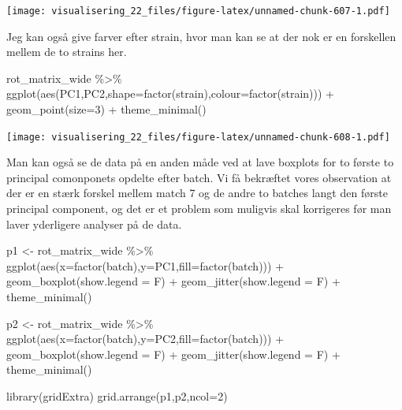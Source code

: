\documentclass[
]{book}
\newenvironment{Shaded}{\begin{snugshade}}{\end{snugshade}}
\newcommand{\AttributeTok}[1]{\textcolor[rgb]{0.77,0.63,0.00}{#1}}
\newcommand{\DecValTok}[1]{\textcolor[rgb]{0.00,0.00,0.81}{#1}}
\newcommand{\FunctionTok}[1]{\textcolor[rgb]{0.00,0.00,0.00}{#1}}
\newcommand{\NormalTok}[1]{#1}
\newcommand{\OtherTok}[1]{\textcolor[rgb]{0.56,0.35,0.01}{#1}}
\newcommand{\SpecialCharTok}[1]{\textcolor[rgb]{0.00,0.00,0.00}{#1}}
\begin{document}
\texttt{[image: visualisering\_22\_files/figure-latex/unnamed-chunk-607-1.pdf]}

Jeg kan også give farver efter strain, hvor man kan se at der nok er en forskellen mellem de to strains her.

\begin{Shaded}
\begin{Highlighting}[]
\NormalTok{rot\_matrix\_wide }\SpecialCharTok{\%\textgreater{}\%}
  \FunctionTok{ggplot}\NormalTok{(}\FunctionTok{aes}\NormalTok{(PC1,PC2,}\AttributeTok{shape=}\FunctionTok{factor}\NormalTok{(strain),}\AttributeTok{colour=}\FunctionTok{factor}\NormalTok{(strain))) }\SpecialCharTok{+} 
  \FunctionTok{geom\_point}\NormalTok{(}\AttributeTok{size=}\DecValTok{3}\NormalTok{) }\SpecialCharTok{+}
  \FunctionTok{theme\_minimal}\NormalTok{()}
\end{Highlighting}
\end{Shaded}

\texttt{[image: visualisering\_22\_files/figure-latex/unnamed-chunk-608-1.pdf]}

Man kan også se de data på en anden måde ved at lave boxplots for to første to principal comonponets opdelte efter batch. Vi få bekræftet vores observation at der er en stærk forskel mellem match 7 og de andre to batches langt den første principal component, og det er et problem som muligvis skal korrigeres før man laver yderligere analyser på de data.

\begin{Shaded}
\begin{Highlighting}[]
\NormalTok{p1 }\OtherTok{\textless{}{-}}\NormalTok{ rot\_matrix\_wide }\SpecialCharTok{\%\textgreater{}\%} 
  \FunctionTok{ggplot}\NormalTok{(}\FunctionTok{aes}\NormalTok{(}\AttributeTok{x=}\FunctionTok{factor}\NormalTok{(batch),}\AttributeTok{y=}\NormalTok{PC1,}\AttributeTok{fill=}\FunctionTok{factor}\NormalTok{(batch))) }\SpecialCharTok{+} \FunctionTok{geom\_boxplot}\NormalTok{(}\AttributeTok{show.legend =}\NormalTok{ F) }\SpecialCharTok{+} \FunctionTok{geom\_jitter}\NormalTok{(}\AttributeTok{show.legend =}\NormalTok{ F) }\SpecialCharTok{+} \FunctionTok{theme\_minimal}\NormalTok{()}

\NormalTok{p2 }\OtherTok{\textless{}{-}}\NormalTok{ rot\_matrix\_wide }\SpecialCharTok{\%\textgreater{}\%} 
  \FunctionTok{ggplot}\NormalTok{(}\FunctionTok{aes}\NormalTok{(}\AttributeTok{x=}\FunctionTok{factor}\NormalTok{(batch),}\AttributeTok{y=}\NormalTok{PC2,}\AttributeTok{fill=}\FunctionTok{factor}\NormalTok{(batch))) }\SpecialCharTok{+} \FunctionTok{geom\_boxplot}\NormalTok{(}\AttributeTok{show.legend =}\NormalTok{ F) }\SpecialCharTok{+} \FunctionTok{geom\_jitter}\NormalTok{(}\AttributeTok{show.legend =}\NormalTok{ F) }\SpecialCharTok{+} \FunctionTok{theme\_minimal}\NormalTok{()}

\FunctionTok{library}\NormalTok{(gridExtra)}
\FunctionTok{grid.arrange}\NormalTok{(p1,p2,}\AttributeTok{ncol=}\DecValTok{2}\NormalTok{)}
\end{Highlighting}
\end{Shaded}
\end{document}
